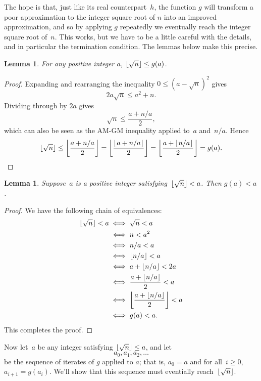 \documentclass[a4paper]{article}
\DeclarePairedDelimiter\floor{\lfloor}{\rfloor}
\theoremstyle{plain}
\newtheorem{lemma}[theorem]{Lemma}
\theoremstyle{definition}
\begin{document}
The hope is that, just like its real counterpart~$h$, the function $g$ will
transform a poor approximation to the integer square root of $n$ into an
improved approximation, and so by applying $g$ repeatedly we eventually reach
the integer square root of~$n$. This works, but we have to be a little careful
with the details, and in particular the termination condition. The lemmas below
make this precise.

\begin{lemma}\label{heron_high}
  For any positive integer $a$, $\floor{\sqrt n} \le g(a)$.
\end{lemma}

\begin{proof}
  Expanding and rearranging the inequality $0 \le (a - \sqrt n)^2$ gives
  $$2a\sqrt n \le a^2 + n.$$
  Dividing through by $2a$ gives
  $$\sqrt n \le \frac{a + n/a}2,$$
  which can also be seen as the AM-GM inequality applied to~$a$ and~$n/a$.
  Hence
  $$\floor{\sqrt n} \le \floor*{\frac{a + n/a}2}
  = \floor*{\frac{\floor{a + n/a}}2}
  = \floor*{\frac{a + \floor{n/a}}2} = g(a).$$
\end{proof}

\begin{lemma}\label{heron_decreases}
  Suppose~$a$ is a positive integer satisfying~$\floor{\sqrt n} < a$. Then
  $g(a) < a$.
\end{lemma}

\begin{proof}
  We have the following chain of equivalences:
  \begin{align*}
    \floor{\sqrt n} < a &\iff \sqrt n < a \\
                        &\iff n < a^2 \\
                        &\iff n/a < a \\
                        &\iff \floor{n/a} < a \\
                        &\iff a + \floor{n/a} < 2a \\
                        &\iff \frac{a + \floor{n/a}}2 < a \\
                        &\iff \floor*{\frac{a + \floor{n/a}}2} < a \\
                        &\iff g(a) < a.
  \end{align*}
  This completes the proof.
\end{proof}

Now let~$a$ be any integer satisfying $\floor{\sqrt n} \le a$, and let
$$a_0, a_1, a_2, \dots$$ be the sequence of iterates of $g$ applied to $a$;
that is, $a_0 = a$ and for all~$i \ge 0$, $a_{i+1} = g(a_i)$. We'll show that
this sequence must eventially reach~$\floor{\sqrt n}$.
\end{document}
